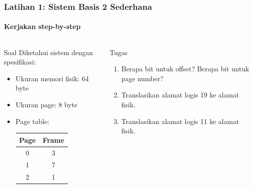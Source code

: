 \documentclass[t,aspectratio=169,xcolor=dvipsnames]{beamer}
\begin{document}
\begin{frame}
    \frametitle{Latihan 1: Sistem Basis 2 Sederhana}
    \framesubtitle{Kerjakan step-by-step}
    \small

    \begin{columns}[T]
        \begin{block}{Soal}
            Diketahui sistem dengan spesifikasi:
            \begin{itemize}
                \item Ukuran memori fisik: 64 byte
                \item Ukuran page: 8 byte
                \item Page table:
                \begin{center}
                \begin{tabular}{|c|c|}
                    \hline
                    \textbf{Page} & \textbf{Frame} \\
                    \hline
                    0 & 3 \\
                    \hline
                    1 & 7 \\
                    \hline
                    2 & 1 \\
                    \hline
                \end{tabular}
                \end{center}
            \end{itemize}
        \end{block}

        \begin{alertblock}{Tugas}
            \begin{enumerate}
                \item Berapa bit untuk offset? Berapa bit untuk page number?
                \item Translasikan alamat logis 19 ke alamat fisik.
                \item Translasikan alamat logis 11 ke alamat fisik.
            \end{enumerate}
        \end{alertblock}
    \end{columns}
\end{frame}
\end{document}
